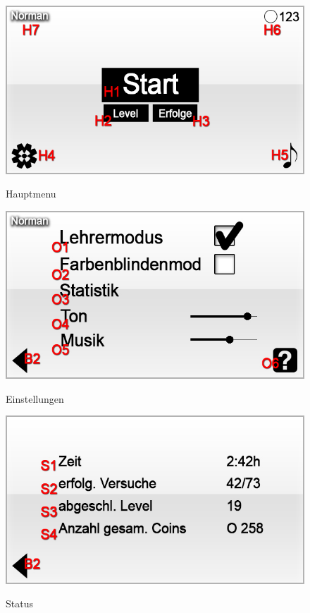 \begin{figure}[H]
\centering
{}\label{fig:Hauptmenu}
\includegraphics[scale=0.55]{../GUI-Entwurf/_jpeg_numeration/main_manu.jpg}
\caption{Hauptmenu}
\end{figure}

\begin{figure}[H]
\centering
{}\label{fig:Einstellungen}
\includegraphics[scale=0.55]{../GUI-Entwurf/_jpeg_numeration/settings.jpg}
\caption{Einstellungen}
\end{figure}

\begin{figure}[H]
\centering
{}\label{fig:Status}
\includegraphics[scale=0.55]{../GUI-Entwurf/_jpeg_numeration/stat.jpg}
\caption{Status}
\end{figure}

